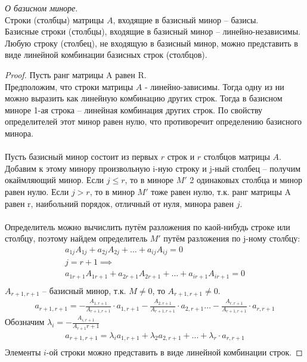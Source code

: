 \begin{theorem}
  \textit{О базисном миноре}. \\ 
  Строки (столбцы) матрицы $A$, входящие в базисный минор -- базисы. \\
  Базисные строки (столбцы), входящие в базисный минор -- линейно-независимы. \\
  Любую строку (столбец), не входящую в базисный минор, можно представить в виде линейной комбинации базисных строк (столбцов).
\end{theorem}
\begin{proof}
  Пусть ранг матрицы A равен R. \\
  Предположим, что строки матрицы $A$ - линейно-зависимы. 
  Тогда одну из ни можно выразить как линейную комбинацию других строк. 
  Тогда в базисном миноре 1-ая строка -- линейная комбинация других строк. 
  По свойству определителей этот минор равен нулю, что противоречит определению базисного минора. \\
  \\
  Пусть базисный минор состоит из первых $r$ строк и $r$ столбцов матрицы $A$. 
  Добавим к этому минору произвольную i-ную строку и j-ный столбец -- получим окаймляющий минор. 
  Если $j \le r$, то в миноре $M'$ 2 одинаковых столбца и минор равен нулю.
  Если $j > r$, то в минор  $M'$ тоже равен нулю, т.к. ранг матрицы A равен r, наибольний порядок, отличный от нуля, минора равен $j$. \\
  \\
  Определитель можно вычислить путём разложения по каой-нибудь строке или столбцу, поэтому найдем определитель $M'$ путём разложения по j-ному столбцу:
   \begin{gather*}
     a_{1j} A_{1j} + a_{2j} A_{2j} + \ldots + a_{ij} A_{ij} = 0 \\
     j = r + 1 \implies \\
     a_{1r+1} A_{1r+1} + a_{2r+1} A_{2r+1} + \ldots + a_{ir+1} A_{ir+1} = 0 \\
  \end{gather*}
  $A_{r+1,r+1}$ -- базисный минор, т.к. $M \neq 0$, то $A_{r+1,r+1} \neq 0$.
  \begin{gather*}
    a_{r+1,r+1} =
    - \frac{A_{1,r+1}}{A_{r+1,r+1}} \cdot  a_{1,r+1}
    - \frac{A_{2,r+1}}{A_{r+1,r+1}} \cdot  a_{2,r+1}
    \ldots
    - \frac{A_{r,r+1}}{A_{r+1,r+1}} \cdot  a_{r,r+1}
  \end{gather*}
  Обозначим $\lambda_i = -\frac{A_{i,r+1}}{A_{r+1}{r+1}}$
  \begin{gather*}
    a_{r+1,r+1} = \lambda_i a_{1,r+1} + \lambda_2 a_{2,r+1} + \ldots + \lambda_r \cdot a_{r,r+1} \\
  \end{gather*}
  Элементы $i$-ой строки можно представить в виде линейной комбинации строк.
\end{proof}

